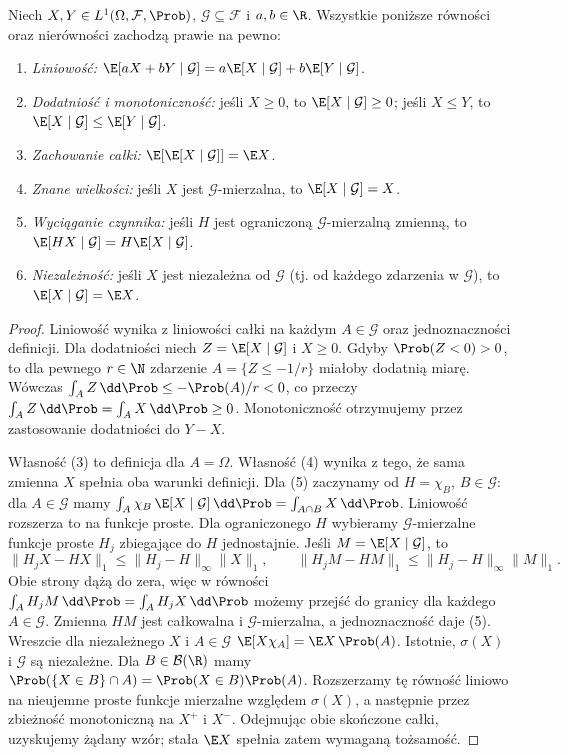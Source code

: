 \begin{twierdzenie}
Niech $X,Y\in L^1(\Omega,\mathcal F,\Prob)$,
$\mathcal G\subseteq\mathcal F$ i $a,b\in\R$.
Wszystkie poniższe równości oraz nierówności zachodzą
prawie na pewno:
\begin{enumerate}
\item \emph{Liniowość:}
$\E[aX+bY\mid\mathcal G]=a\E[X\mid\mathcal G]+b\E[Y\mid\mathcal G]$.
\item \emph{Dodatniość i monotoniczność:} jeśli $X\geq0$,
to $\E[X\mid\mathcal G]\geq0$; jeśli $X\leq Y$,
to $\E[X\mid\mathcal G]\leq\E[Y\mid\mathcal G]$.
\item \emph{Zachowanie całki:}
$\E[\E[X\mid\mathcal G]]=\E X$.
\item \emph{Znane wielkości:} jeśli $X$ jest
$\mathcal G$-mierzalna, to
$\E[X\mid\mathcal G]=X$.
\item \emph{Wyciąganie czynnika:} jeśli $H$ jest
ograniczoną $\mathcal G$-mierzalną zmienną, to
$\E[HX\mid\mathcal G]=H\E[X\mid\mathcal G]$.
\item \emph{Niezależność:} jeśli $X$ jest niezależna
od $\mathcal G$ (tj. od każdego zdarzenia
w $\mathcal G$), to $\E[X\mid\mathcal G]=\E X$.
\end{enumerate}
\end{twierdzenie}
\begin{proof}
Liniowość wynika z liniowości całki na każdym
$A\in\mathcal G$ oraz jednoznaczności definicji.
Dla dodatniości niech $Z=\E[X\mid\mathcal G]$
i $X\geq0$. Gdyby $\Prob(Z<0)>0$, to dla
pewnego $r\in\N$ zdarzenie $A=\{Z\leq-1/r\}$
miałoby dodatnią miarę. Wówczas
$\int_A Z\,\dd\Prob\leq-\Prob(A)/r<0$,
co przeczy $\int_AZ\,\dd\Prob=\int_AX\,\dd\Prob\geq0$.
Monotoniczność otrzymujemy przez zastosowanie
dodatniości do $Y-X$.

Własność (3) to definicja dla $A=\Omega$.
Własność (4) wynika z tego, że sama zmienna $X$
spełnia oba warunki definicji. Dla (5) zaczynamy
od $H=\chi_{B}$, $B\in\mathcal G$: dla
$A\in\mathcal G$ mamy
$\int_A\chi_{B}\,\E[X\mid\mathcal G] \,\dd\Prob
=\int_{A\cap B}X\,\dd\Prob$.
Liniowość rozszerza to na funkcje proste.
Dla ograniczonego $H$ wybieramy $\mathcal G$-mierzalne
funkcje proste $H_j$ zbiegające do $H$ jednostajnie.
Jeśli $M=\E[X\mid\mathcal G]$, to
\[
\|H_jX-HX\|_1\leq\|H_j-H\|_\infty\|X\|_1,\qquad
\|H_jM-HM\|_1\leq\|H_j-H\|_\infty\|M\|_1.
\]
Obie strony dążą do zera, więc w równości
$\int_A H_jM\,\dd\Prob=\int_A H_jX\,\dd\Prob$
możemy przejść do granicy dla każdego $A\in\mathcal G$.
Zmienna $HM$ jest całkowalna i $\mathcal G$-mierzalna,
a jednoznaczność daje (5).
Wreszcie dla niezależnego $X$ i $A\in\mathcal G$
$\E[X\chi_{A}]=\E X\,\Prob(A)$.
Istotnie, $\sigma(X)$ i $\mathcal G$ są niezależne.
Dla $B\in\mathcal B(\R)$ mamy
$\Prob(\{X\in B\}\cap A)=\Prob(X\in B)\Prob(A)$.
Rozszerzamy tę równość liniowo na nieujemne
proste funkcje mierzalne względem $\sigma(X)$,
a następnie przez zbieżność monotoniczną na $X^+$ i $X^-$. Odejmując obie
skończone całki, uzyskujemy żądany wzór;
stała $\E X$ spełnia zatem wymaganą tożsamość.
\end{proof}

